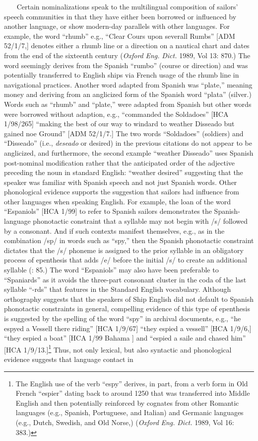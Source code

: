 ~~~   Certain nominalizations speak to the multilingual composition of sailors’ speech communities in that they have either been borrowed or influenced by another language, or show modern-day parallels with other languages. For example, the word “rhumb” e.g., “Clear Cours upon severall Rumbs” [ADM 52/1/7,] denotes either a rhumb line or a direction on a nautical chart and dates from the end of the sixteenth century (\textit{Oxford} \textit{Eng.} \textit{Dict.} 1989, Vol 13: 870.) The word seemingly derives from the Spanish “rumbo” (course or direction) and was potentially transferred to English ships via French usage of the rhumb line in navigational practices. Another word adapted from Spanish was “plate,” meaning money and deriving from an anglicized form of the Spanish word “plata” (silver.) Words such as “rhumb” and “plate,” were adapted from Spanish but other words were borrowed without adaption, e.g., “commanded the Soldadoes” [HCA 1/98/265] “making the best of our way to windard to weather Disseado but gained noe Ground” [ADM 52/1/7.] The two words “Soldadoes” (soldiers) and “Disseado” (i.e., \textit{deseado} or desired) in the previous citations do not appear to be anglicized, and furthermore, the second example “weather Disseado” uses Spanish post-nominal modification rather that the anticipated order of the adjective preceding the noun in standard English: “weather desired” suggesting that the speaker was familiar with Spanish speech and not just Spanish words. Other phonological evidence supports the suggestion that sailors had influence from other languages when speaking English. For example, the loan of the word “Espaniols” [HCA 1/99] to refer to Spanish sailors demonstrates the Spanish-language phonotactic constraint that a syllable may not begin with /s/ followed by a consonant. And if such contexts manifest themselves, e.g., as in the combination /sp/ in words such as “spy,” then the Spanish phonotactic constraint dictates that the /s/ phoneme is assigned to the prior syllable in an obligatory process of epenthesis that adds /e/ before the initial /s/ to create an additional syllable (\citealt{Schnitzer1997}: 85.) The word “Espaniols” may also have been preferable to “Spaniards” as it avoids the three-part consonant cluster in the coda of the last syllable “-rds” that features in the Standard English vocabulary. Although orthography suggests that the speakers of Ship English did not default to Spanish phonotactic constraints in general, compelling evidence of this type of epenthesis is suggested by the spelling of the word “spy” in archival documents, e.g., “he espyed a Vessell there riding” [HCA 1/9/67] “they espied a vessell” [HCA 1/9/6,] “they espied a boat” [HCA 1/99 Bahama \citealt{Islands1722}] and “espied a saile and chased him” [HCA 1/9/13.]\footnote{The English use of the verb “espy” derives, in part, from a verb form in Old French “espier” dating back to around 1250 that was transferred into Middle English and then potentially reinforced by cognates from other Romantic languages (e.g., Spanish, Portuguese, and Italian) and Germanic languages (e.g., Dutch, Swedish, and Old Norse,) (\textit{Oxford} \textit{Eng.} \textit{Dict.} 1989, Vol 16: 383.)} Thus, not only lexical, but also syntactic and phonological evidence suggests that language contact in 